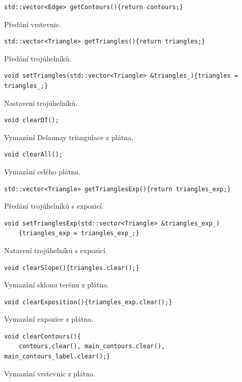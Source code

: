 \documentclass[a4paper, 12pt, oneside, titlepage]{article} %
\begin{document}
\begin{verbatim}
std::vector<Edge> getContours(){return contours;}
\end{verbatim}
Předání vrstevnic.\\

\begin{verbatim}
std::vector<Triangle> getTriangles(){return triangles;}
\end{verbatim}
Předání trojúhelníků.\\

\begin{verbatim}
void setTriangles(std::vector<Triangle> &triangles_){triangles = triangles_;}
\end{verbatim}
Nastavení trojúhelníků.\\

\begin{verbatim}
void clearDT();
\end{verbatim}
Vymazání Delaunay triangulace z plátna.\\

\begin{verbatim}
void clearAll();
\end{verbatim}
Vymazání celého plátna.\\

\begin{verbatim}
std::vector<Triangle> getTrianglesExp(){return triangles_exp;}
\end{verbatim}
Předání trojúhelníků s expozicí.\\

\begin{verbatim}
void setTrianglesExp(std::vector<Triangle> &triangles_exp_)
    {triangles_exp = triangles_exp_;}
\end{verbatim}
Natavení trojúhelníků s expozicí.\\

\begin{verbatim}
void clearSlope(){triangles.clear();}
\end{verbatim}
Vymazání sklonu terénu z plátna.\\

\begin{verbatim}
void clearExposition(){triangles_exp.clear();}
\end{verbatim}
Vymazání expozice z plátna.\\

\begin{verbatim}
void clearContours(){
    contours.clear(), main_contours.clear(), main_contours_label.clear();}
\end{verbatim}
Vymazání vrstevnic z plátna.\\
\end{document}
